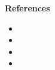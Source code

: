 \documentclass[final,mathserif]{beamer}
\begin{document}
\begin{frame}[fragile]
\begin{columns}[t]
\begin{column}{.31\linewidth}
{\Large \alert{\textbf{References}}}

\vspace{.1in}

\begin{block}

\footnotesize

\begin{itemize}
\item 

\item 

\item

\item
\end{itemize}
\end{block}

\end{column}
\end{columns}

\end{frame}
\end{document}
